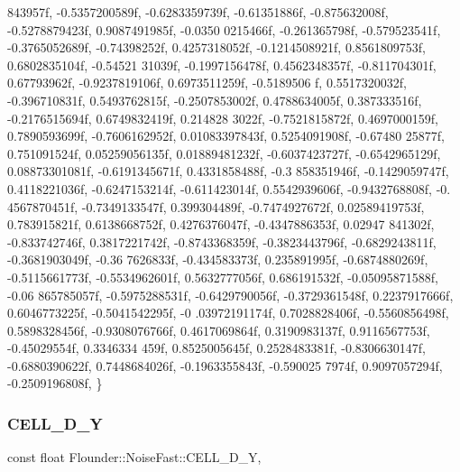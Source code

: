 \begin{DoxyCode}
      843957f, -0.5357200589f, -0.6283359739f, -0.61351886f, -0.875632008f, -0.5278879423f, 0.9087491985f, -0.0350
      0215466f, -0.261365798f, -0.579523541f,
        -0.3765052689f, -0.74398252f, 0.4257318052f, -0.1214508921f, 0.8561809753f, 0.6802835104f, -0.54521
      31039f, -0.1997156478f, 0.4562348357f, -0.811704301f, 0.67793962f, -0.9237819106f, 0.6973511259f, -0.5189506
      f, 0.5517320032f, -0.396710831f,
        0.5493762815f, -0.2507853002f, 0.4788634005f, 0.387333516f, -0.2176515694f, 0.6749832419f, 0.214828
      3022f, -0.7521815872f, 0.4697000159f, 0.7890593699f, -0.7606162952f, 0.01083397843f, 0.5254091908f, -0.67480
      25877f, 0.751091524f, 0.05259056135f,
        0.01889481232f, -0.6037423727f, -0.6542965129f, 0.08873301081f, -0.6191345671f, 0.4331858488f, -0.3
      858351946f, -0.1429059747f, 0.4118221036f, -0.6247153214f, -0.611423014f, 0.5542939606f, -0.9432768808f, -0.
      4567870451f, -0.7349133547f, 0.399304489f,
        -0.7474927672f, 0.02589419753f, 0.783915821f, 0.6138668752f, 0.4276376047f, -0.4347886353f, 0.02947
      841302f, -0.833742746f, 0.3817221742f, -0.8743368359f, -0.3823443796f, -0.6829243811f, -0.3681903049f, -0.36
      7626833f, -0.434583373f, 0.235891995f,
        -0.6874880269f, -0.5115661773f, -0.5534962601f, 0.5632777056f, 0.686191532f, -0.05095871588f, -0.06
      865785057f, -0.5975288531f, -0.6429790056f, -0.3729361548f, 0.2237917666f, 0.6046773225f, -0.5041542295f, -0
      .03972191174f, 0.7028828406f, -0.5560856498f,
        0.5898328456f, -0.9308076766f, 0.4617069864f, 0.3190983137f, 0.9116567753f, -0.45029554f, 0.3346334
      459f, 0.8525005645f, 0.2528483381f, -0.8306630147f, -0.6880390622f, 0.7448684026f, -0.1963355843f, -0.590025
      7974f, 0.9097057294f, -0.2509196808f,
    \}
\end{DoxyCode}
\mbox{\label{class_flounder_1_1_noise_fast_a97eb8a12815bfa08ce3827766d1b4686}} 
\subsubsection{\texorpdfstring{C\+E\+L\+L\+\_\+D\+\_\+Y}{CELL\_3D\_Y}}
{\footnotesize\ttfamily const float Flounder\+::\+Noise\+Fast\+::\+C\+E\+L\+L\+\_\+D\+\_\+Y\hspace{0.3cm}{\ttfamily [static]}, {\ttfamily [private]}}

